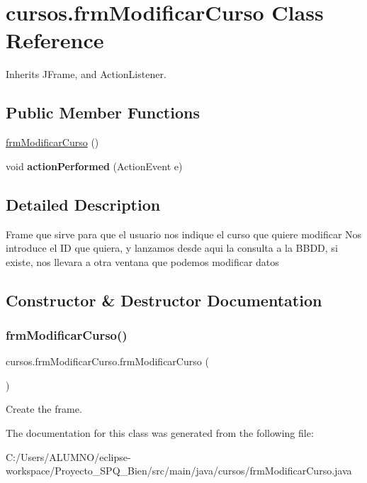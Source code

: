 \hypertarget{classcursos_1_1frm_modificar_curso}{}\section{cursos.\+frm\+Modificar\+Curso Class Reference}
\label{classcursos_1_1frm_modificar_curso}


Inherits J\+Frame, and Action\+Listener.

\subsection*{Public Member Functions}
\begin{DoxyCompactItemize}
\item 
\hyperlink{classcursos_1_1frm_modificar_curso_a3bd766afa10c8c0d6f6d645afe904723}{frm\+Modificar\+Curso} ()
\item 
\mbox{\label{classcursos_1_1frm_modificar_curso_ae7737be2972758df5fac2a927d9edb45}} 
void {\bfseries action\+Performed} (Action\+Event e)
\end{DoxyCompactItemize}


\subsection{Detailed Description}
Frame que sirve para que el usuario nos indique el curso que quiere modificar Nos introduce el ID que quiera, y lanzamos desde aqui la consulta a la B\+B\+DD, si existe, nos llevara a otra ventana que podemos modificar datos 

\subsection{Constructor \& Destructor Documentation}
\mbox{\label{classcursos_1_1frm_modificar_curso_a3bd766afa10c8c0d6f6d645afe904723}} 
\subsubsection{\texorpdfstring{frm\+Modificar\+Curso()}{frmModificarCurso()}}
{\footnotesize\ttfamily cursos.\+frm\+Modificar\+Curso.\+frm\+Modificar\+Curso (\begin{DoxyParamCaption}{ }\end{DoxyParamCaption})}

Create the frame. 

The documentation for this class was generated from the following file\+:\begin{DoxyCompactItemize}
\item 
C\+:/\+Users/\+A\+L\+U\+M\+N\+O/eclipse-\/workspace/\+Proyecto\+\_\+\+S\+P\+Q\+\_\+Bien/src/main/java/cursos/frm\+Modificar\+Curso.\+java\end{DoxyCompactItemize}
